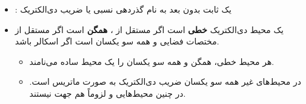 \begin{ELunit}


\begin{itemize}
\item
  : یک ثابت بدون بعد به نام گذردهی نسبی یا ضریب دی‌الکتریک
\item
  یک محیط دی‌الکتریک \textbf{خطی} است اگر  مستقل از ، \textbf{همگن} است اگر  مستقل از مختصات فضایی و همه سو یکسان است اگر  اسکالر باشد.

  \begin{itemize}
  \tightlist
  \item
    هر محیط خطی، همگن و همه سو یکسان را یک محیط ساده می‌نامند.
  \item
    در محیط‌های غیر همه سو یکسان ضریب دی‌الکتریک به صورت ماتریس است. در چنین محیط‌هایی  و  لزوماً هم جهت نیستند.
  \end{itemize}
\end{itemize}

\end{ELunit}



